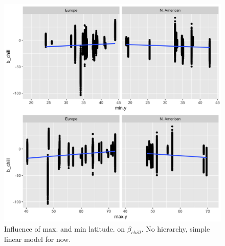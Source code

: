 \documentclass[11pt]{article}
\begin{document}
\begin{figure}[h!]
    \centering
         \includegraphics[width=.9\textwidth]{..//figures/cheap_approach/unmodeled_lat.png}
    \caption{Influence of max. and min latitude. on $\beta_{chill}$. No hierarchy, simple linear model for now.} 
    \label{fig:lat}
\end{figure}
\end{document}
